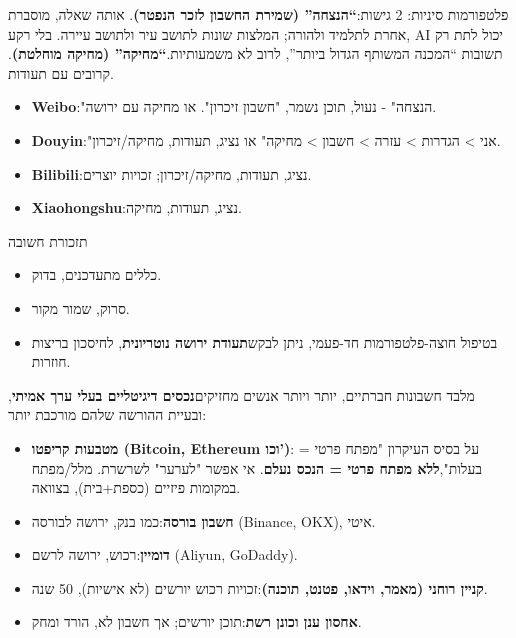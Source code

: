 
פלטפורמות סיניות: 2 גישות:\textbf{“הנצחה” (שמירת החשבון לזכר הנפטר)}. אותה שאלה, מוסברת אחרת לתלמיד ולהורה; המלצות שונות לתושב עיר ולתושב עיירה. בלי רקע, AI יכול לתת רק תשובות “המכנה המשותף הגדול ביותר”, לרוב לא משמעותיות.\textbf{“מחיקה” (מחיקה מוחלטת)}. קרובים עם תעודות.

\begin{itemize}
  \item \textbf{Weibo}:"הנצחה" - נעול, תוכן נשמר, "חשבון זיכרון". או מחיקה עם ירושה.
  \item \textbf{Douyin}:"אני > הגדרות > עזרה > חשבון > מחיקה" או נציג, תעודות, מחיקה/זיכרון.
  \item \textbf{Bilibili}:נציג, תעודות, מחיקה/זיכרון; זכויות יוצרים.
  \item \textbf{Xiaohongshu}:נציג, תעודות, מחיקה.
\end{itemize}

\begin{tcbinfo}{תזכורת חשובה}
\begin{itemize}
  \item כללים מתעדכנים, בדוק.
  \item סרוק, שמור מקור.
  \item בטיפול חוצה-פלטפורמות חד-פעמי, ניתן לבקש\textbf{תעודת ירושה נוטריונית}, לחיסכון בריצות חוזרות.
\end{itemize}

\end{tcbinfo}


מלבד חשבונות חברתיים, יותר ויותר אנשים מחזיקים\textbf{נכסים דיגיטליים בעלי ערך אמיתי}, ובעיית ההורשה שלהם מורכבת יותר:

\begin{itemize}
  \item \textbf{מטבעות קריפטו (Bitcoin, Ethereum וכו')}: על בסיס העיקרון "מפתח פרטי = בעלות",\textbf{ללא מפתח פרטי = הנכס נעלם}. אי אפשר "לערער" לשרשרת. מלל/מפתח במקומות פיזיים (כספת+בית), בצוואה.
  \item \textbf{חשבון בורסה}:כמו בנק, ירושה לבורסה (Binance, OKX), איטי.
  \item \textbf{דומיין}:רכוש, ירושה לרשם (Aliyun, GoDaddy).
  \item \textbf{קניין רוחני (מאמר, וידאו, פטנט, תוכנה)}:זכויות רכוש יורשים (לא אישיות), 50 שנה.
  \item \textbf{אחסון ענן וכונן רשת}:תוכן יורשים; אך חשבון לא, הורד ומחק.
\end{itemize}

